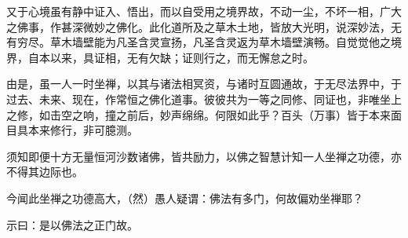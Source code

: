 又于心境虽有静中证入、悟出，而以自受用之境界故，不动一尘，不坏一相，广大之佛事，作甚深微妙之佛化。此化道所及之草木土地，皆放大光明，说深妙法，无有穷尽。草木墙壁能为凡圣含灵宣扬，凡圣含灵返为草木墙壁演畅。自觉觉他之境界，自本以来，具证相，无有欠缺；证则行之，而无懈怠之时。

由是，虽一人一时坐禅，以其与诸法相冥资，与诸时互圆通故，于无尽法界中，于过去、未来、现在，作常恒之佛化道事。彼彼共为一等之同修、同证也，非唯坐上之修，如击空之响，撞之前后，妙声绵绵。何限如此乎？百头（万事）皆于本来面目具本来修行，非可臆测。

须知即便十方无量恒河沙数诸佛，皆共励力，以佛之智慧计知一人坐禅之功德，亦不得其边际也。

今闻此坐禅之功德高大，（然）愚人疑谓：佛法有多门，何故偏劝坐禅耶？

示曰：是以佛法之正门故。

